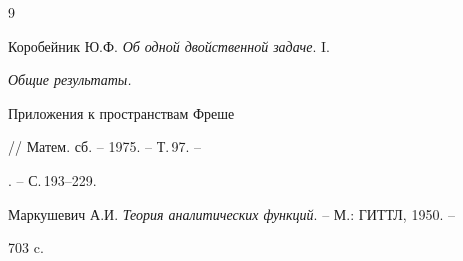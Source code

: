 \begin{thebibliography}{9}







Коробейник Ю.Ф. {\em Об одной двойственной задаче}. I. {\em Общие результаты.


Приложения к пространствам Фреше} // Матем. сб. -- 1975. --  Т.\,97. --


. -- С.\,193--229.




Маркушевич А.И. {\em Теория аналитических функций}. -- М.: ГИТТЛ, 1950. --


703 c.





\end{thebibliography}





\vskip 2cm












\label{end}





